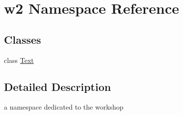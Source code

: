 \hypertarget{namespacew2}{\section{w2 Namespace Reference}
\label{namespacew2}
}
\subsection*{Classes}
\begin{DoxyCompactItemize}
\item 
class \hyperlink{classw2_1_1Text}{Text}
\end{DoxyCompactItemize}


\subsection{Detailed Description}
a namespace dedicated to the workshop 